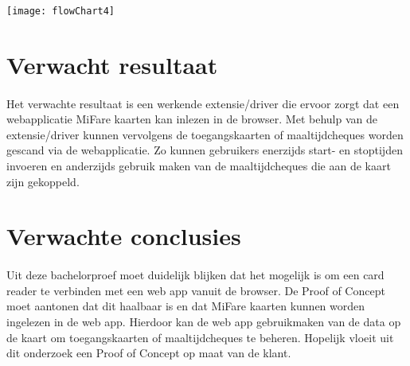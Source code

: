\begin{center}
    \texttt{[image: flowChart4]}
\end{center}

\bigskip
\section{Verwacht resultaat}%
\label{sec:verwachte_resultaten}
\paragraph{}
Het verwachte resultaat is een werkende extensie/driver die ervoor zorgt dat een webapplicatie MiFare kaarten kan inlezen in de browser. Met behulp van de extensie/driver kunnen vervolgens de toegangskaarten of maaltijdcheques worden gescand via de webapplicatie. Zo kunnen gebruikers enerzijds start- en stoptijden invoeren en anderzijds gebruik maken van de maaltijdcheques die aan de kaart zijn gekoppeld.

\bigskip
\section{Verwachte conclusies}%
\label{sec:Verwachte_conclusies}
\paragraph{}
Uit deze bachelorproef moet duidelijk blijken dat het mogelijk is om een card reader te verbinden met een web app vanuit de browser. De Proof of Concept moet aantonen dat dit haalbaar is en dat MiFare kaarten kunnen worden ingelezen in de web app. Hierdoor kan de web app gebruikmaken van de data op de kaart om toegangskaarten of maaltijdcheques te beheren. Hopelijk vloeit uit dit onderzoek een Proof of Concept op maat van de klant.